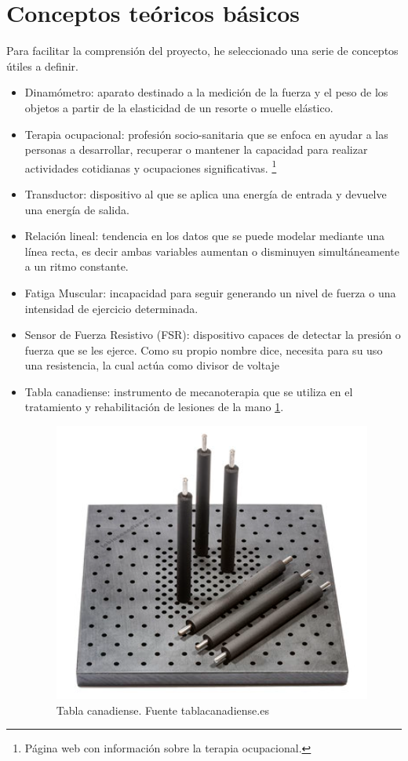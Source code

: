 \section{Conceptos teóricos básicos}
Para facilitar la comprensión del proyecto, he seleccionado una serie de conceptos útiles a definir. 
\begin{itemize}
    \item Dinamómetro: aparato destinado a la medición de la fuerza y el peso de los objetos a partir de la elasticidad de un resorte o muelle elástico.\cite{Dinamometro}
    \item Terapia ocupacional: profesión socio-sanitaria que se enfoca en ayudar a las personas a desarrollar, recuperar o mantener la capacidad para realizar actividades cotidianas y ocupaciones significativas. \cite{T.O}\footnote{Página web con información sobre la terapia ocupacional\cite{T.O}.}
    \item Transductor: dispositivo al que se aplica una energía de entrada y devuelve una energía de salida. \cite{celulas_extensométricas}
    \item Relación lineal: tendencia en los datos que se puede modelar mediante una línea recta, es decir ambas variables aumentan o disminuyen simultáneamente a un ritmo constante. \cite{Relación_lineal}
    \item Fatiga Muscular: incapacidad para seguir generando un nivel de fuerza o una intensidad de ejercicio determinada. \cite{gomez_campos_mecanismos_2010}
    \item Sensor de Fuerza Resistivo (FSR): dispositivo capaces de detectar la presión o fuerza que se les ejerce. Como su propio nombre dice, necesita para su uso una resistencia, la cual actúa como divisor de voltaje
    \item Tabla canadiense: instrumento de mecanoterapia que se utiliza en el tratamiento y rehabilitación de lesiones de la mano \ref{fig:tabla canadiense}\cite{cantero_tellez_terapia_2020}.
    \begin{figure}
        \centering
        \includegraphics[width=0.5\linewidth]{img/Tabla_Canadiense.png}
        \caption{Tabla canadiense. Fuente tablacanadiense.es}
        \label{fig:tabla canadiense}
    \end{figure}
\end{itemize}
